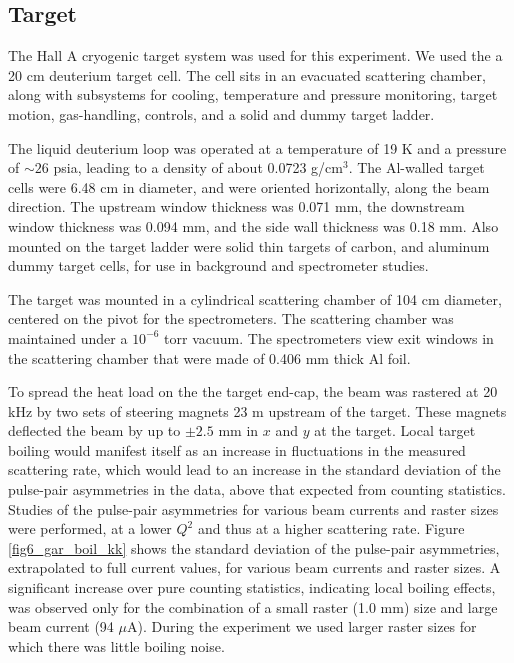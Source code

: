 \subsection{Target}\label{sec:target}

The Hall A cryogenic target system 
\cite{A-NIM} was used for this experiment. 
We used the a 20 cm deuterium target cell.
The cell sits in an evacuated scattering chamber, 
along with subsystems for cooling,
temperature and pressure monitoring, target motion, gas-handling,
controls, and a solid and dummy target ladder.  

The liquid deuterium loop was operated at a temperature of 19 K and a
pressure of $\sim 26$ psia, leading to a density of about 0.0723
g/cm$^3$. The Al-walled target cells were 6.48 cm in diameter, and
were oriented horizontally, along the beam direction. The upstream
window thickness was 0.071 mm, the downstream window thickness was
0.094 mm, and the side wall thickness was 0.18 mm. Also mounted on the
target ladder were solid thin targets of carbon, and aluminum dummy
target cells, for use in background and spectrometer studies.

The target was mounted in a cylindrical scattering chamber of 104 cm
diameter, centered on the pivot for the spectrometers. The scattering
chamber was maintained under a $10^{-6}$ torr vacuum. The
spectrometers view exit windows in the scattering chamber that were
made of 0.406 mm thick Al foil.

To spread the heat load on the the target end-cap,
the beam was rastered at 20 kHz by two sets of
steering magnets 23 m upstream of the target. These magnets deflected
the beam by up to $\pm 2.5$ mm in $x$ and $y$ at
the target.  
Local target boiling would manifest itself as an increase in fluctuations in the
measured scattering rate, which would lead to an increase in the
standard deviation of the pulse-pair asymmetries in the data, above
that expected from counting statistics. Studies of the pulse-pair
asymmetries for various beam currents and raster sizes were performed,
at a lower $Q^2$ and thus at a higher scattering rate. Figure
\ref{fig6_gar_boil_kk} shows the standard deviation of the 
pulse-pair asymmetries, extrapolated to full current values, for
various beam currents and raster sizes. A significant increase over
pure counting statistics, indicating local boiling effects, was
observed only for the combination of a small raster (1.0 mm) size and
large beam current (94 $\mu$A).  During the experiment we used
larger raster sizes for which there was little boiling noise.
